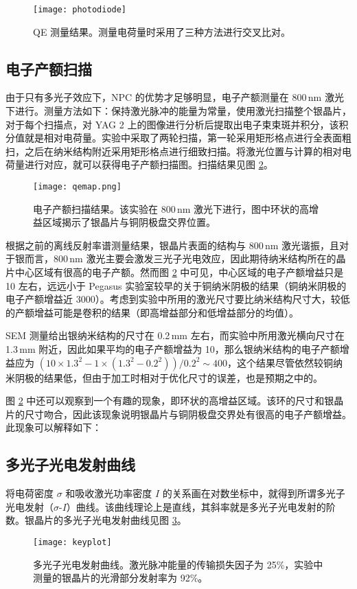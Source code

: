 \begin{figure}[htbp]
\begin{center}
\texttt{[image: photodiode]}
\caption{\label{fig:QE} QE 测量结果。测量电荷量时采用了三种方法进行交叉比对。}
\end{center}
\end{figure}

\subsection{电子产额扫描}
由于只有多光子效应下，NPC 的优势才足够明显，电子产额测量在 800\,nm 激光下进行。测量方法如下：保持激光脉冲的能量为常量，使用激光扫描整个银晶片，对于每个扫描点，对 YAG 2 上的图像进行分析后提取出电子束束斑并积分，该积分值就是相对电荷量。实验中采取了两轮扫描，第一轮采用矩形格点进行全表面粗扫，之后在纳米结构附近采用矩形格点进行细致扫描。将激光位置与计算的相对电荷量进行对应，就可以获得电子产额扫描图。扫描结果见图 \ref{fig:qemap}。
\begin{figure}[htbp]
\begin{center}
\texttt{[image: qemap.png]}
\caption{\label{fig:qemap} 电子产额扫描结果。该实验在 800\,nm 激光下进行，图中环状的高增益区域揭示了银晶片与铜阴极盘交界位置。}
\end{center}
\end{figure}

根据之前的离线反射率谱测量结果，银晶片表面的结构与 800\,nm 激光谐振，且对于银而言，800\,nm 激光主要会激发三光子光电效应，因此期待纳米结构所在的晶片中心区域有很高的电子产额。然而图 \ref{fig:qemap} 中可见，中心区域的电子产额增益只是 10 左右，远远小于 Pegasus 实验室较早的关于铜纳米阴极的结果（铜纳米阴极的电子产额增益近 3000）。考虑到实验中所用的激光尺寸要比纳米结构尺寸大，较低的产额增益可能是卷积的结果（即高增益部分和低增益部分的均值）。

SEM 测量给出银纳米结构的尺寸在 0.2\,mm 左右，而实验中所用激光横向尺寸在 1.3\,mm 附近，因此如果平均的电子产额增益为 10，那么银纳米结构的电子产额增益应为 $(10\times1.3^2-1\times(1.3^2-0.2^2))/0.2^2 \sim 400$，这个结果尽管依然较铜纳米阴极的结果低，但由于加工时相对于优化尺寸的误差，也是预期之中的。

图 \ref{fig:qemap} 中还可以观察到一个有趣的现象，即环状的高增益区域。该环的尺寸和银晶片的尺寸吻合，因此该现象说明银晶片与铜阴极盘交界处有很高的电子产额增益。此现象可以解释如下：

\subsection{多光子光电发射曲线}
将电荷密度 $\sigma$ 和吸收激光功率密度 $I$ 的关系画在对数坐标中，就得到所谓多光子光电发射（$\sigma$-$I$）曲线。该曲线理论上是直线，其斜率就是多光子光电发射的阶数。银晶片的多光子光电发射曲线见图 \ref{fig:key}。
\begin{figure}[htbp]
\begin{center}
\texttt{[image: keyplot]}
\caption{\label{fig:key} 
多光子光电发射曲线。激光脉冲能量的传输损失因子为 25\%，实验中测量的银晶片的光滑部分发射率为 92\%。}
\end{center}
\end{figure}

